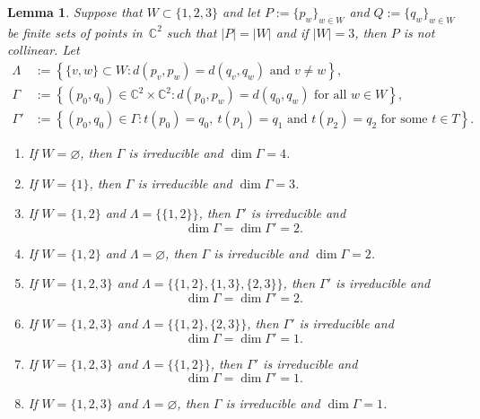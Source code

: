 \documentclass[12pt]{article}
\newtheorem{lemma}{Lemma}
\theoremstyle{definition}
\newenvironment{claims}{\begin{enumerate}[topsep=0pt,itemsep=0pt,leftmargin=8mm,label=\textnormal{\textbf{(\alph*)}},ref=(\alph*)]}{\end{enumerate}}
\newcommand{\st}{such that }
\newcommand{\set}[2]{\left\{#1:#2\right\}}
\newcommand{\C}{{\mathbb{C}}}
\newcommand{\sd}{d} %
\begin{document}
\begin{lemma}
\label{lem:fib}
Suppose that $W\subset\{1,2,3\}$ and let $P:=\{p_w\}_{w\in W}$ and $Q:=\{q_w\}_{w\in W}$
be finite sets of points in~$\C^2$ \st $|P|=|W|$ and if $|W|=3$, then $P$ is not collinear.
Let
\begin{align*}
\Lambda     &:=\set{\{v,w\}\subset W}{\sd(p_v,p_w)=\sd(q_v,q_w) \text{ and }v\neq w},\\
\Gamma&:=\set{(p_0,q_0)\in\C^2\times\C^2}{\sd(p_0,p_w)=\sd(q_0,q_w) \text{ for all } w\in W},\\
\Gamma'&:=\set{(p_0,q_0)\in \Gamma}{t(p_0)=q_0,~ t(p_1)=q_1 \text{ and } t(p_2)=q_2 \text{ for some }t\in T}.
\end{align*}
\begin{claims}
\item\label{lem:fib:a}
If $W=\varnothing$,
then $\Gamma$ is irreducible and $\dim \Gamma=4$.
\item\label{lem:fib:b}
If $W=\{1\}$,
then $\Gamma$ is irreducible and $\dim \Gamma=3$.
\item\label{lem:fib:c}
If $W=\{1,2\}$ and $\Lambda=\{\{1,2\}\}$,
then $\Gamma'$ is irreducible and
\[
\dim \Gamma=\dim\Gamma'=2.
\]
\item\label{lem:fib:d}
If $W=\{1,2\}$ and $\Lambda=\varnothing$, then $\Gamma$ is irreducible and $\dim \Gamma=2$.
\item\label{lem:fib:e}
If $W=\{1,2,3\}$ and $\Lambda=\{\{1,2\},\{1,3\},\{2,3\}\}$,
then $\Gamma'$ is irreducible and
\[
\dim \Gamma=\dim\Gamma'=2.
\]
\item\label{lem:fib:f}
If $W=\{1,2,3\}$ and $\Lambda=\{\{1,2\},\{2,3\}\}$,
then $\Gamma'$ is irreducible and
\[
\dim \Gamma=\dim\Gamma'=1.
\]
\item\label{lem:fib:g}
If $W=\{1,2,3\}$ and $\Lambda=\{\{1,2\}\}$,
then $\Gamma'$ is irreducible and
\[
\dim \Gamma=\dim\Gamma'=1.
\]
\item\label{lem:fib:h}
If $W=\{1,2,3\}$ and $\Lambda=\varnothing$,
then $\Gamma$ is irreducible and $\dim \Gamma=1$.
\end{claims}
\end{lemma}
\end{document}
